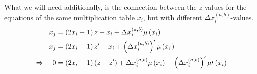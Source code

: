 What we will need additionally, is the connection between the $z$-values for the equations of the same multiplication table $x_{i}$, but with different $\Delta x_{i}^{\left(a,b\right)}$-values.
\begin{alignat}{3}
	x_{j} &= \left(2x_{i} + 1\right)z + x_{i} + \Delta x_{i}^{\left(a,b\right)}\mu\left(x_{i}\right) \notag \\
	x_{j} &= \left(2x_{i} + 1\right)z^{\prime} + x_{i} + \left(\Delta x_{i}^{\left(a,b\right)}\right)^{\prime}\mu\left(x_{i}\right) \notag \\ 
	\Rightarrow \quad 0 &= \left(2x_{i} + 1\right)\left(z - z^{\prime}\right) + \Delta x_{i}^{\left(a,b\right)}\mu\left(x_{i}\right) - \left(\Delta x_{i}^{\left(a,b\right)}\right)^{\prime}\mu\prime\left(x_{i}\right) \label{eq:differentDeltaxforsamexi}
\end{alignat}








